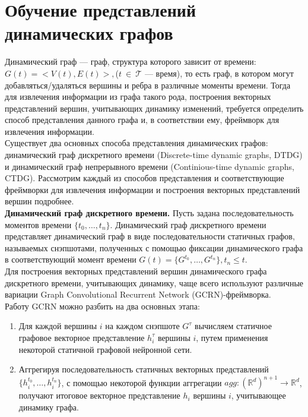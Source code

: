 \documentclass{mipt-thesis-ms}
\renewcommand{\leq}{\leqslant}  %
\begin{document}
\section{Обучение представлений динамических графов}
Динамический граф --- граф, структура которого зависит от времени: $G(t) = <V(t), E(t)>,$($t~\in~\mathcal{T}$ --- время), то есть граф, в котором могут добавляться/удаляться вершины и ребра в различные моменты времени. Тогда для извлечения информации из графа такого рода, построения векторных представлений вершин, учитывающих динамику изменений, требуется определить способ представления данного графа и, в соответствии ему, фреймворк для извлечения информации.\\

Существует два основных способа представления динамических графов: динамический граф дискретного времени (Discrete-time dynamic graphs, DTDG) и динамический граф непрерывного времени (Continious-time dynamic graphs, CTDG). Рассмотрим каждый из способов представления и соответствующие фреймворки для извлечения информации и построения векторных представлений вершин подробнее.\\

{\bf Динамический граф дискретного времени.} Пусть задана последовательность моментов времени $\{t_0, \dots, t_n\}$. Динамический граф дискретного времени представляет динамический граф в виде последовательности статичных графов, называемых снэпшотами, полученных с помощью фиксации динамического графа в соответствующий момент времени $G(t) = \{G^{t_0}, \dots, G^{t_n}\}, t_n \leq t$.\\

Для построения векторных представлений вершин динамического графа дискретного времени, учитывающих динамику, чаще всего используют различные вариации Graph Convolutional Recurrent Network (GCRN)-фреймворка.\\

Работу GCRN можно разбить на два основных этапа:
\begin{enumerate}
\item Для каждой вершины $i$ на каждом снэпшоте $G^{\tau}$ вычисляем статичное графовое векторное представление $h_i^{\tau}$ вершины $i$, путем применения некоторой статичной графовой нейронной сети.
\item Аггрегируя последовательность статичных векторных представлений $\{h_i^{t_0}, \dots, h_i^{t_n}\}$, с помощью некоторой функции аггрегации $agg: (\mathbb{R}^d)^{n+1} \rightarrow \mathbb{R}^d$, получают итоговое векторное представление $h_i$ вершины $i$, учитывающее динамику графа.
\end{enumerate}
\end{document}
